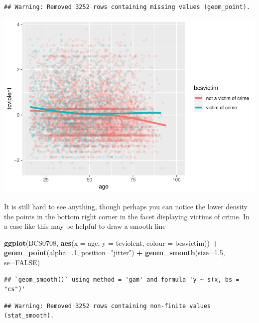 \documentclass[]{book}
\newenvironment{Shaded}{\begin{snugshade}}{\end{snugshade}}
\newcommand{\DataTypeTok}[1]{\textcolor[rgb]{0.13,0.29,0.53}{#1}}
\newcommand{\DecValTok}[1]{\textcolor[rgb]{0.00,0.00,0.81}{#1}}
\newcommand{\FloatTok}[1]{\textcolor[rgb]{0.00,0.00,0.81}{#1}}
\newcommand{\KeywordTok}[1]{\textcolor[rgb]{0.13,0.29,0.53}{\textbf{#1}}}
\newcommand{\NormalTok}[1]{#1}
\newcommand{\OperatorTok}[1]{\textcolor[rgb]{0.81,0.36,0.00}{\textbf{#1}}}
\newcommand{\OtherTok}[1]{\textcolor[rgb]{0.56,0.35,0.01}{#1}}
\newcommand{\StringTok}[1]{\textcolor[rgb]{0.31,0.60,0.02}{#1}}
\theoremstyle{definition}
\theoremstyle{definition}
\theoremstyle{definition}
\theoremstyle{remark}
\begin{document}
\begin{verbatim}
## Warning: Removed 3252 rows containing missing values (geom_point).
\end{verbatim}

\includegraphics{03-visualisation_files/figure-latex/unnamed-chunk-49-1.pdf}

It is still hard to see anything, though perhaps you can notice the
lower density the points in the bottom right corner in the facet
displaying victims of crime. In a case like this may be helpful to draw
a smooth line

\begin{Shaded}
\begin{Highlighting}[]
\KeywordTok{ggplot}\NormalTok{(BCS0708, }\KeywordTok{aes}\NormalTok{(}\DataTypeTok{x =}\NormalTok{ age, }\DataTypeTok{y =}\NormalTok{ tcviolent, }\DataTypeTok{colour =}\NormalTok{ bcsvictim)) }\OperatorTok{+}
\StringTok{  }\KeywordTok{geom_point}\NormalTok{(}\DataTypeTok{alpha=}\NormalTok{.}\DecValTok{1}\NormalTok{, }\DataTypeTok{position=}\StringTok{"jitter"}\NormalTok{) }\OperatorTok{+}
\StringTok{  }\KeywordTok{geom_smooth}\NormalTok{(}\DataTypeTok{size=}\FloatTok{1.5}\NormalTok{, }\DataTypeTok{se=}\OtherTok{FALSE}\NormalTok{)}
\end{Highlighting}
\end{Shaded}

\begin{verbatim}
## `geom_smooth()` using method = 'gam' and formula 'y ~ s(x, bs = "cs")'
\end{verbatim}

\begin{verbatim}
## Warning: Removed 3252 rows containing non-finite values (stat_smooth).
\end{verbatim}
\end{document}
